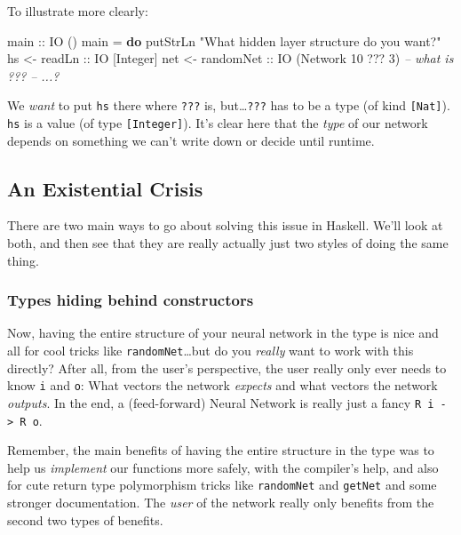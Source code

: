\documentclass[]{article}
\newenvironment{Shaded}{\begin{snugshade}}{\end{snugshade}}
\newcommand{\CommentTok}[1]{\textcolor[rgb]{0.56,0.35,0.01}{\textit{#1}}}
\newcommand{\DataTypeTok}[1]{\textcolor[rgb]{0.13,0.29,0.53}{#1}}
\newcommand{\DecValTok}[1]{\textcolor[rgb]{0.00,0.00,0.81}{#1}}
\newcommand{\FunctionTok}[1]{\textcolor[rgb]{0.00,0.00,0.00}{#1}}
\newcommand{\KeywordTok}[1]{\textcolor[rgb]{0.13,0.29,0.53}{\textbf{#1}}}
\newcommand{\NormalTok}[1]{#1}
\newcommand{\OtherTok}[1]{\textcolor[rgb]{0.56,0.35,0.01}{#1}}
\newcommand{\StringTok}[1]{\textcolor[rgb]{0.31,0.60,0.02}{#1}}
\begin{document}
To illustrate more clearly:

\begin{Shaded}
\begin{Highlighting}[]
\OtherTok{main ::} \DataTypeTok{IO}\NormalTok{ ()}
\NormalTok{main }\FunctionTok{=} \KeywordTok{do}
\NormalTok{    putStrLn }\StringTok{"What hidden layer structure do you want?"}
\NormalTok{    hs  }\OtherTok{<- readLn    ::} \DataTypeTok{IO}\NormalTok{ [}\DataTypeTok{Integer}\NormalTok{]}
\NormalTok{    net }\OtherTok{<- randomNet ::} \DataTypeTok{IO}\NormalTok{ (}\DataTypeTok{Network} \DecValTok{10} \FunctionTok{???} \DecValTok{3}\NormalTok{)   }\CommentTok{-- what is ???}
    \CommentTok{-- ...?}
\end{Highlighting}
\end{Shaded}

We \emph{want} to put \texttt{hs} there where \texttt{???} is,
but\ldots{}\texttt{???} has to be a type (of kind \texttt{{[}Nat{]}}).
\texttt{hs} is a value (of type \texttt{{[}Integer{]}}). It's clear here that
the \emph{type} of our network depends on something we can't write down or
decide until runtime.

\hypertarget{an-existential-crisis}{%
\subsection{An Existential Crisis}\label{an-existential-crisis}}

There are two main ways to go about solving this issue in Haskell. We'll look at
both, and then see that they are really actually just two styles of doing the
same thing.

\hypertarget{types-hiding-behind-constructors}{%
\subsubsection{Types hiding behind
constructors}\label{types-hiding-behind-constructors}}

Now, having the entire structure of your neural network in the type is nice and
all for cool tricks like \texttt{randomNet}\ldots{}but do you \emph{really} want
to work with this directly? After all, from the user's perspective, the user
really only ever needs to know \texttt{i} and \texttt{o}: What vectors the
network \emph{expects} and what vectors the network \emph{outputs}. In the end,
a (feed-forward) Neural Network is really just a fancy
\texttt{R\ i\ -\textgreater{}\ R\ o}.

Remember, the main benefits of having the entire structure in the type was to
help us \emph{implement} our functions more safely, with the compiler's help,
and also for cute return type polymorphism tricks like \texttt{randomNet} and
\texttt{getNet} and some stronger documentation. The \emph{user} of the network
really only benefits from the second two types of benefits.
\end{document}
